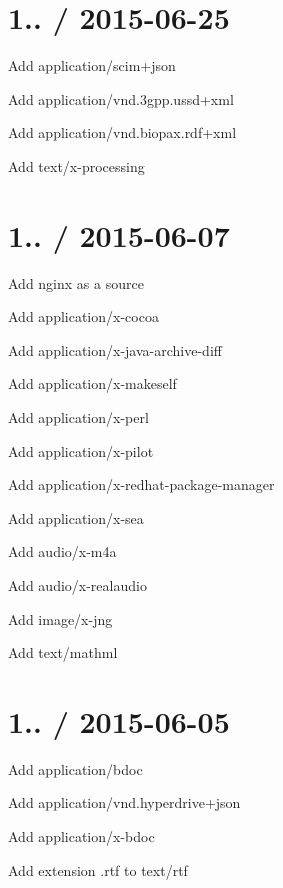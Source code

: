 \section*{1.. / 2015-\/06-\/25 }


\begin{DoxyItemize}
\item Add {\ttfamily application/scim+json}
\item Add {\ttfamily application/vnd.\+3gpp.\+ussd+xml}
\item Add {\ttfamily application/vnd.\+biopax.\+rdf+xml}
\item Add {\ttfamily text/x-\/processing}
\end{DoxyItemize}

\section*{1.. / 2015-\/06-\/07 }


\begin{DoxyItemize}
\item Add nginx as a source
\item Add {\ttfamily application/x-\/cocoa}
\item Add {\ttfamily application/x-\/java-\/archive-\/diff}
\item Add {\ttfamily application/x-\/makeself}
\item Add {\ttfamily application/x-\/perl}
\item Add {\ttfamily application/x-\/pilot}
\item Add {\ttfamily application/x-\/redhat-\/package-\/manager}
\item Add {\ttfamily application/x-\/sea}
\item Add {\ttfamily audio/x-\/m4a}
\item Add {\ttfamily audio/x-\/realaudio}
\item Add {\ttfamily image/x-\/jng}
\item Add {\ttfamily text/mathml}
\end{DoxyItemize}

\section*{1.. / 2015-\/06-\/05 }


\begin{DoxyItemize}
\item Add {\ttfamily application/bdoc}
\item Add {\ttfamily application/vnd.\+hyperdrive+json}
\item Add {\ttfamily application/x-\/bdoc}
\item Add extension {\ttfamily .rtf} to {\ttfamily text/rtf}
\end{DoxyItemize}

